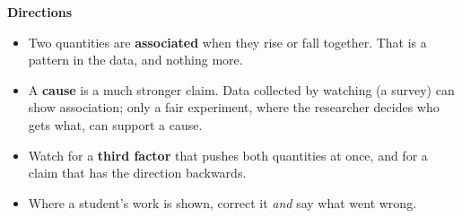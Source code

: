 \documentclass[12pt]{article}
\begin{document}

\vspace{0.05cm}
\noindent\textbf{Directions}
\begin{itemize}[leftmargin=0.9cm, itemsep=1pt, topsep=2pt]
  \item Two quantities are \textbf{associated} when they rise or fall together. That is a pattern in the data, and nothing more.
  \item A \textbf{cause} is a much stronger claim. Data collected by watching (a survey) can show association; only a fair experiment, where the researcher decides who gets what, can support a cause.
  \item Watch for a \textbf{third factor} that pushes both quantities at once, and for a claim that has the direction backwards.
  \item Where a student's work is shown, correct it \textit{and} say what went wrong.
\end{itemize}

\end{document}
